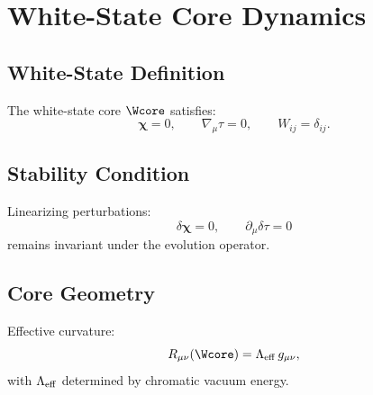 \chapter{White-State Core Dynamics}

\section{White-State Definition}

The white-state core $\Wcore$ satisfies:
\[
\bm{\chi}=0,\qquad 
\nabla_\mu \tau =0,\qquad 
W_{ij}=\delta_{ij}.
\]

\section{Stability Condition}

Linearizing perturbations:
\[
\delta \bm{\chi}=0,\qquad 
\partial_\mu \delta\tau =0
\]
remains invariant under the evolution operator.

\section{Core Geometry}

Effective curvature:
\[
R_{\mu\nu}(\Wcore)
=
\Lambda_{\rm eff}\, g_{\mu\nu},
\]
with $\Lambda_{\rm eff}$ determined by chromatic vacuum energy.


